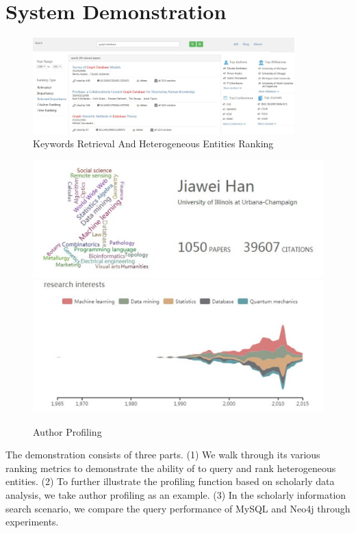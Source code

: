 \section{System Demonstration}
\label{sec-demo}

\begin{figure}[tp]
\centering
\includegraphics[width=0.9\textwidth]{searchKeywords.pdf}
\caption{Keywords Retrieval And Heterogeneous Entities Ranking}
\label{fig:searchKeywords}
\vspace{-3ex}
\end{figure}

\begin{figure}
\centering
\includegraphics[width=0.8\columnwidth]{hjwAvatar.pdf}
\includegraphics[width=0.8\columnwidth]{hjwInterest.pdf}
\caption{Author Profiling}
\label{fig:hjwProfile}
\vspace{-3ex}
\end{figure}

The demonstration consists of three parts. (1) We walk through its various ranking metrics to demonstrate the ability of \oursystem to query and rank heterogeneous entities. (2) To further illustrate the profiling function based on scholarly data analysis, we take author profiling as an example. (3) In the scholarly information search scenario, we compare the query performance of MySQL and Neo4j through experiments.


